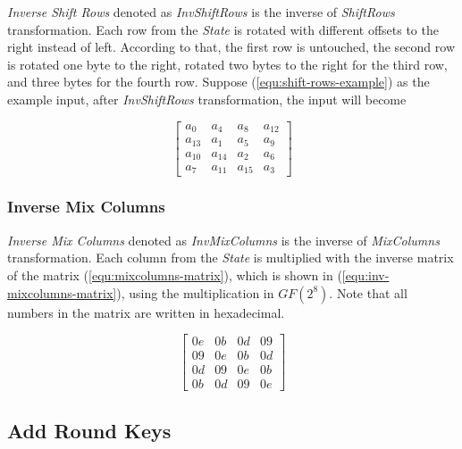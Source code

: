 \documentclass[a4paper, 10pt]{article}
\begin{document}
\begin{multicols}{2}
            \textit{Inverse Shift Rows} denoted as \textit{InvShiftRows} is the inverse of \textit{ShiftRows} transformation. Each row from the \textit{State} is rotated with different offsets to the right instead of left. According to that, the first row is untouched, the second row is rotated one byte to the right, rotated two bytes to the right for the third row, and three bytes for the fourth row. Suppose (\ref{equ:shift-rows-example}) as the example input, after \textit{InvShiftRows} transformation, the input will become

            \begin{equation}
                \begin{bmatrix}
                    a_{0} & a_{4} & a_{8} & a_{12}\\
                    a_{13} & a_{1} & a_{5} & a_{9}\\
                    a_{10} & a_{14} & a_{2} & a_{6}\\
                    a_{7} & a_{11} & a_{15} & a_{3}
                \end{bmatrix}
            \end{equation}

            \subsubsection{Inverse Mix Columns}

            \textit{Inverse Mix Columns} denoted as \textit{InvMixColumns} is the inverse of \textit{MixColumns} transformation. Each column from the \textit{State} is multiplied with the inverse matrix of the matrix (\ref{equ:mixcolumns-matrix}), which is shown in (\ref{equ:inv-mixcolumns-matrix}), using the multiplication in \textit{$GF(2^{8})$}. Note that all numbers in the matrix are written in hexadecimal.

            \begin{equation}
                \begin{bmatrix}
                    0e & 0b & 0d & 09\\
                    09 & 0e & 0b & 0d\\
                    0d & 09 & 0e & 0b\\
                    0b & 0d & 09 & 0e
                \end{bmatrix}
                \label{equ:inv-mixcolumns-matrix}
            \end{equation}

            \subsection{Add Round Keys}


\end{multicols}
\end{document}
